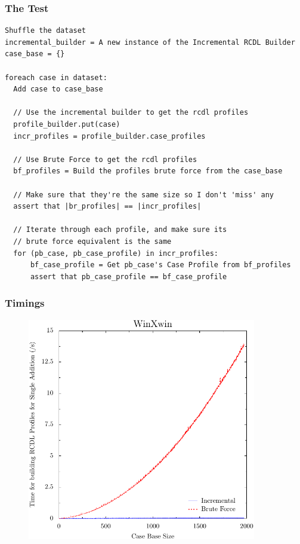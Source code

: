 \documentclass[a4paper,11pt]{report}
\begin{document}
\medspace
\vspace{10pt}

\begin{samepage}
\subsubsection{The Test}
\begin{verbatim}
Shuffle the dataset
incremental_builder = A new instance of the Incremental RCDL Builder
case_base = {}

foreach case in dataset:
  Add case to case_base
  
  // Use the incremental builder to get the rcdl profiles
  profile_builder.put(case)
  incr_profiles = profile_builder.case_profiles
  
  // Use Brute Force to get the rcdl profiles
  bf_profiles = Build the profiles brute force from the case_base
  
  // Make sure that they're the same size so I don't 'miss' any
  assert that |br_profiles| == |incr_profiles|
  
  // Iterate through each profile, and make sure its 
  // brute force equivalent is the same
  for (pb_case, pb_case_profile) in incr_profiles:
      bf_case_profile = Get pb_case's Case Profile from bf_profiles
      assert that pb_case_profile == bf_case_profile
\end{verbatim}

\end{samepage}

\subsubsection{Timings}
\begin{figure}[h!]
\includegraphics[width=10cm]{./ExperimentResults/WinXwinTimings}
\end{figure}
\end{document}

